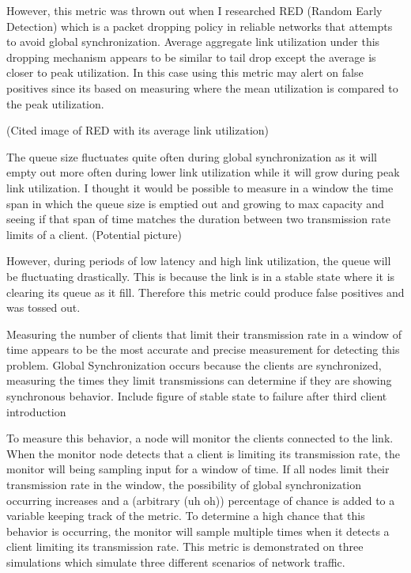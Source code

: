 \documentclass{article}
\begin{document}
	\indent However, this metric was thrown out when I researched RED (Random Early Detection) which is a packet dropping policy in reliable networks that attempts to avoid global synchronization. Average aggregate link utilization under this dropping mechanism appears to be similar to tail drop except the average is closer to peak utilization. In this case using this metric may alert on false positives since its based on measuring where the mean utilization is compared to the peak utilization. \newline
	
																			(Cited image of RED with its average link utilization)
	
	The queue size fluctuates quite often during global synchronization as it will empty out more often during lower link utilization while it will grow during peak link utilization. I thought it would be possible to measure in a window the time span in which the queue size is emptied out and growing to max capacity and seeing if that span of time matches the duration between two transmission rate limits of a client.\newline
	(Potential picture)\newline
	
	However, during periods of low latency and high link utilization, the queue will be fluctuating drastically. This is because the link is in a stable state where it is clearing its queue as it fill. Therefore this metric could produce false positives and was tossed out.\newline
	
	Measuring the number of clients that limit their transmission rate in a window of time appears to be the most accurate and precise measurement for detecting this problem. Global Synchronization occurs because the clients are synchronized, measuring the times they limit transmissions can determine if they are showing synchronous behavior.\newline
																{Include figure of stable state to failure after third client introduction}
																
	To measure this behavior, a node will monitor the clients connected to the link. When the monitor node detects that a client is limiting its transmission rate, the monitor will being sampling input for a window of time. If all nodes limit their transmission rate in the window, the possibility of global synchronization occurring increases and a (arbitrary (uh oh)) percentage of chance is added to a variable keeping track of the metric. To determine a high chance that this behavior is occurring, the monitor will sample multiple times when it detects a client limiting its transmission rate.\newline
	This metric is demonstrated on three simulations which simulate three different scenarios of network traffic.\newline
	
\end{document}

